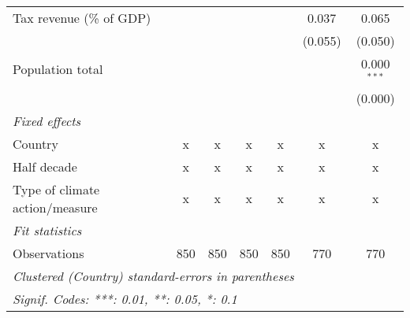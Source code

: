 \begin{tabular}{lcccccc}
   Tax revenue (\% of GDP)                          &         &         &         &                & 0.037          & 0.065\\   
                                                    &         &         &         &                & (0.055)        & (0.050)\\   
   Population total                                 &         &         &         &                &                & 0.000$^{***}$\\   
                                                    &         &         &         &                &                & (0.000)\\   
   \emph{Fixed effects}\\
   Country                                          & x       & x       & x       & x              & x              & x\\  
   Half decade                                      & x       & x       & x       & x              & x              & x\\  
   Type of climate action/measure                   & x       & x       & x       & x              & x              & x\\  
   \midrule \emph{Fit statistics}\\
   Observations                                     & 850     & 850     & 850     & 850            & 770            & 770\\  
   \midrule
   \multicolumn{7}{l}{\emph{Clustered (Country) standard-errors in parentheses}}\\
   \multicolumn{7}{l}{\emph{Signif. Codes: ***: 0.01, **: 0.05, *: 0.1}}\\
\end{tabular}
\par\endgroup


